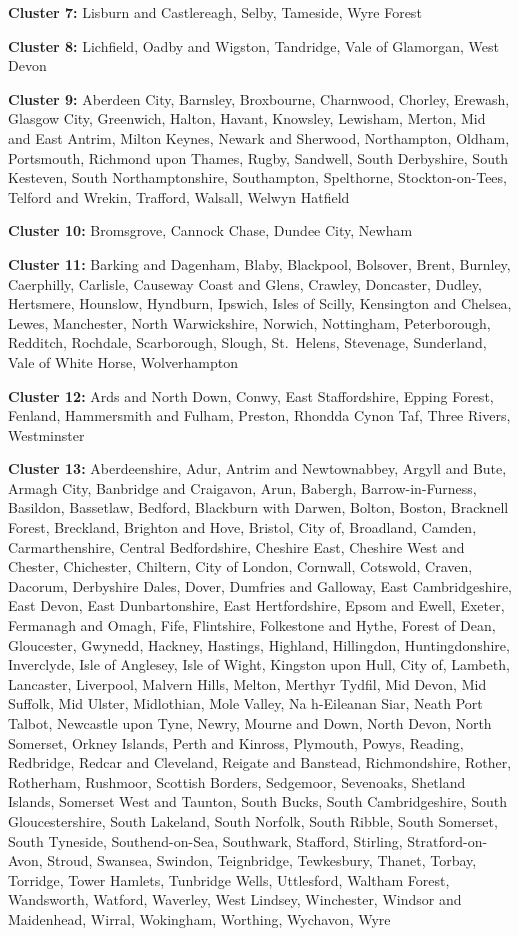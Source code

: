 \documentclass[Royal,times,sageh]{sagej}
\begin{document}
\textbf{Cluster 7: } Lisburn and Castlereagh, Selby, Tameside, Wyre
Forest

\textbf{Cluster 8: } Lichfield, Oadby and Wigston, Tandridge, Vale of
Glamorgan, West Devon

\textbf{Cluster 9: } Aberdeen City, Barnsley, Broxbourne, Charnwood,
Chorley, Erewash, Glasgow City, Greenwich, Halton, Havant, Knowsley,
Lewisham, Merton, Mid and East Antrim, Milton Keynes, Newark and
Sherwood, Northampton, Oldham, Portsmouth, Richmond upon Thames, Rugby,
Sandwell, South Derbyshire, South Kesteven, South Northamptonshire,
Southampton, Spelthorne, Stockton-on-Tees, Telford and Wrekin, Trafford,
Walsall, Welwyn Hatfield

\textbf{Cluster 10: } Bromsgrove, Cannock Chase, Dundee City, Newham

\textbf{Cluster 11: } Barking and Dagenham, Blaby, Blackpool, Bolsover,
Brent, Burnley, Caerphilly, Carlisle, Causeway Coast and Glens, Crawley,
Doncaster, Dudley, Hertsmere, Hounslow, Hyndburn, Ipswich, Isles of
Scilly, Kensington and Chelsea, Lewes, Manchester, North Warwickshire,
Norwich, Nottingham, Peterborough, Redditch, Rochdale, Scarborough,
Slough, St.~Helens, Stevenage, Sunderland, Vale of White Horse,
Wolverhampton

\textbf{Cluster 12: } Ards and North Down, Conwy, East Staffordshire,
Epping Forest, Fenland, Hammersmith and Fulham, Preston, Rhondda Cynon
Taf, Three Rivers, Westminster

\textbf{Cluster 13: } Aberdeenshire, Adur, Antrim and Newtownabbey,
Argyll and Bute, Armagh City, Banbridge and Craigavon, Arun, Babergh,
Barrow-in-Furness, Basildon, Bassetlaw, Bedford, Blackburn with Darwen,
Bolton, Boston, Bracknell Forest, Breckland, Brighton and Hove, Bristol,
City of, Broadland, Camden, Carmarthenshire, Central Bedfordshire,
Cheshire East, Cheshire West and Chester, Chichester, Chiltern, City of
London, Cornwall, Cotswold, Craven, Dacorum, Derbyshire Dales, Dover,
Dumfries and Galloway, East Cambridgeshire, East Devon, East
Dunbartonshire, East Hertfordshire, Epsom and Ewell, Exeter, Fermanagh
and Omagh, Fife, Flintshire, Folkestone and Hythe, Forest of Dean,
Gloucester, Gwynedd, Hackney, Hastings, Highland, Hillingdon,
Huntingdonshire, Inverclyde, Isle of Anglesey, Isle of Wight, Kingston
upon Hull, City of, Lambeth, Lancaster, Liverpool, Malvern Hills,
Melton, Merthyr Tydfil, Mid Devon, Mid Suffolk, Mid Ulster, Midlothian,
Mole Valley, Na h-Eileanan Siar, Neath Port Talbot, Newcastle upon Tyne,
Newry, Mourne and Down, North Devon, North Somerset, Orkney Islands,
Perth and Kinross, Plymouth, Powys, Reading, Redbridge, Redcar and
Cleveland, Reigate and Banstead, Richmondshire, Rother, Rotherham,
Rushmoor, Scottish Borders, Sedgemoor, Sevenoaks, Shetland Islands,
Somerset West and Taunton, South Bucks, South Cambridgeshire, South
Gloucestershire, South Lakeland, South Norfolk, South Ribble, South
Somerset, South Tyneside, Southend-on-Sea, Southwark, Stafford,
Stirling, Stratford-on-Avon, Stroud, Swansea, Swindon, Teignbridge,
Tewkesbury, Thanet, Torbay, Torridge, Tower Hamlets, Tunbridge Wells,
Uttlesford, Waltham Forest, Wandsworth, Watford, Waverley, West Lindsey,
Winchester, Windsor and Maidenhead, Wirral, Wokingham, Worthing,
Wychavon, Wyre
\end{document}
